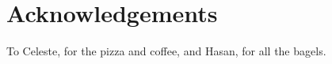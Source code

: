 \documentclass[tog]{acmsiggraph}
\begin{document}
%

\section*{Acknowledgements}

To Celeste, for the pizza and coffee, and Hasan, for all the bagels.


\nocite{*}

\end{document}
